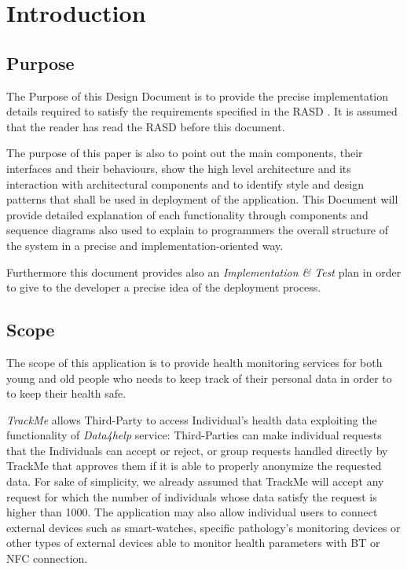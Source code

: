 \documentclass[a4paper]{article}
\begin{document}

\tableofcontents
\listoffigures
{}

\newpage
\pagestyle{fancy}

\section{Introduction}
\subsection{Purpose}
    The Purpose of this Design Document is to provide the precise implementation details required to satisfy the requirements specified in the RASD \cite{rasd}.
    It is assumed that the reader has read the RASD before this document.
    
    The purpose of this paper is also to point out the main components, their interfaces and their behaviours, show the high level architecture and its interaction with architectural components and to identify style and design patterns that shall be used in deployment of the application. This Document will provide detailed explanation of each functionality through components and sequence diagrams also used to explain to programmers the overall structure of the system in a precise and implementation-oriented way.
    
    Furthermore this document provides also an \textit{Implementation \& Test} plan in order to give to the developer a precise idea of the deployment process.
 
\subsection{Scope}
    The scope of this application is to provide health monitoring services for both young and old people who needs to keep track of their personal data in order to to keep their health safe.
    
    \textit{TrackMe} allows Third-Party to access Individual's health data exploiting the functionality of \textit{Data4help} service: Third-Parties can make individual requests that the Individuals can accept or reject, or group requests handled directly by TrackMe that approves them if it is able to properly anonymize the requested data. For sake of simplicity, we already assumed that TrackMe will accept any request for which the number of individuals whose data satisfy the request is higher than 1000. The application may also allow individual users to connect external devices such as smart-watches, specific pathology's monitoring devices or other types of external devices able to monitor health parameters with BT or NFC connection.
\end{document}
